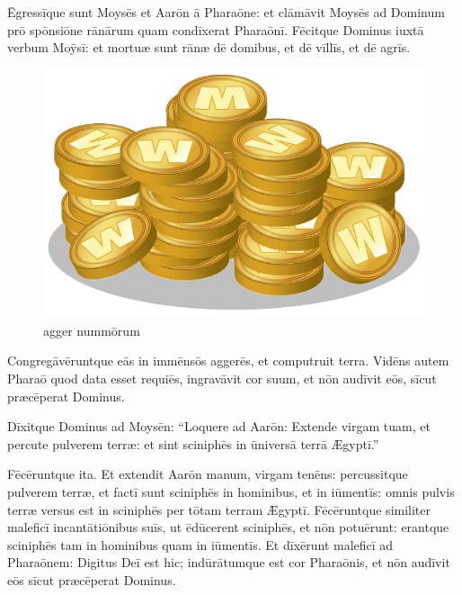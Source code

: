 Ēgressīque sunt
Moysēs et Aarōn ā Pharaōne: et clāmāvit
Moysēs ad Dominum prō spōnsiōne
rānārum quam condīxerat
Pharaōnī.  Fēcitque Dominus iuxtā verbum Moȳsī: et
mortuæ sunt rānæ dē domibus, et dē vīllīs, et dē agrīs.

\begin{figure}[h]
    \begin{minipage}[h!]{1\linewidth}
        \centering
        \includegraphics{agger.png}
        \caption{agger nummōrum}
    \end{minipage}%
\end{figure}

Congregāvēruntque eās in immēnsōs
aggerēs, et computruit terra.  Vidēns autem
Pharaō quod data esset requiēs, ingravāvit cor suum, et nōn
audīvit eōs, sīcut præcēperat Dominus. 

Dīxitque Dominus ad Moysēn: ``Loquere ad Aarōn: Extende
virgam tuam, et percute pulverem terræ: et sint
 sciniphēs in ūniversā terrā Ægyptī.''

Fēcēruntque ita. Et
extendit Aarōn manum, virgam tenēns: percussitque pulverem
terræ, et factī sunt sciniphēs in hominibus, et in
iūmentīs: omnis pulvis terræ versus est in
sciniphēs per tōtam terram Ægyptī.  Fēcēruntque
similiter maleficī
incantātiōnibus suīs, ut ēdūcerent
sciniphēs, et nōn potuērunt: erantque
sciniphēs tam in hominibus quam in
iūmentīs.  Et dīxērunt maleficī ad
Pharaōnem: Digitus Deī est hic; indūrātumque est cor Pharaōnis, et nōn audīvit eōs
sīcut præcēperat Dominus.  


